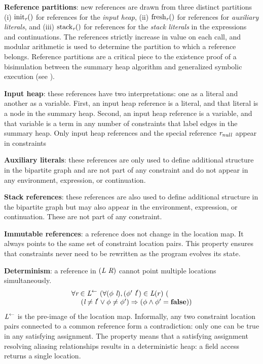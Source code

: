 \textbf{Reference partitions}: new references are drawn from
  three distinct partitions (i) $\mathrm{init}_{\emph{r}}()$ for references for the \emph{input heap}, (ii) $\mathrm{fresh}_{\emph{r}}()$ for references for \emph{auxiliary literals}, and
  (iii) $\mathrm{stack}_{\emph{r}}()$ for references for the \emph{stack literals} in the expressions and
  continuations. The references strictly increase in value on each
  call, and modular arithmetic is used to determine the partition to
  which a reference belongs. Reference partitions are a critical piece
  to the existence proof of a bisimulation between the summary heap
  algorithm and generalized symbolic execution (see ).
\begin{compactitem}
\item \textbf{Input heap}: these references have two
  interpretations: one as a literal and another as a variable. First,
  an input heap reference is a literal, and that literal is a node in
  the summary heap. Second, an input heap reference is a variable, and
  that variable is a term in any number of constraints that label
  edges in the summary heap. Only input heap references and the
  special reference $\emph{r}_\mathit{null}$ appear in constraints
\item \textbf{Auxiliary literals}: these references are only used to define additional structure in
  the bipartite graph and are not part of any constraint and do not appear
  in any environment, expression, or continuation.
\item \textbf{Stack references}: these references are also used to define additional structure in the bipartite graph but may also appear in the environment, expression, or continuation. These are not part of any constraint.
\end{compactitem}

\textbf{Immutable references}: a reference does not change in the
location map. It always points to the same set of constraint location
pairs. This property ensures that constraints never need to be
rewritten as the program evolves its state.

\textbf{Determinism}: a reference in  $(\emph{L}\ \emph{R})$ cannot point multiple locations simultaneously.
$$
\begin{array}{l}
\forall \cfgnt{r} \in \cfgnt{L}^\leftarrow\ (\forall (\phi\ \cfgnt{l}),(\phi^\prime\ \cfgnt{l}^\prime) \in \cfgnt{L}(r)\ (\\
\ \ \ \ (\cfgnt{l} \neq \cfgnt{l}^\prime \vee \phi \neq \phi^\prime) \Rightarrow (\phi \wedge \phi^\prime = \cfgt{false}))
\end{array}
$$
$\emph{L}^\leftarrow$ is the pre-image of the location
map. Informally, any two constraint location pairs connected to a
common reference form a contradiction: only one can be true in any
satisfying assignment. The property means that a satisfying assignment
resolving aliasing relationships results in a deterministic heap: a
field access returns a single location.


